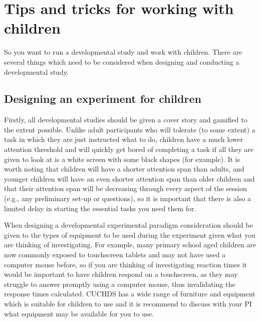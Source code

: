 \documentclass[
  12pt,
]{book}
\begin{document}
\chapter{Tips and tricks for working with children}\label{tips-and-tricks-for-working-with-children}

So you want to run a developmental study and work with children. There are several things which need to be considered when designing and conducting a developmental study.

\section{Designing an experiment for children}\label{designing-an-experiment-for-children}

Firstly, all developmental studies should be given a cover story and gamified to the extent possible. Unlike adult participants who will tolerate (to some extent) a task in which they are just instructed what to do, children have a much lower attention threshold and will quickly get bored of completing a task if all they are given to look at is a white screen with some black shapes (for example). It is worth noting that children will have a shorter attention span than adults, and younger children will have an even shorter attention span than older children and that their attention span will be decreasing through every aspect of the session (e.g., any preliminary set-up or questions), so it is important that there is also a limited delay in starting the essential tasks you need them for.

When designing a developmental experimental paradigm consideration should be given to the types of equipment to be used during the experiment given what you are thinking of investigating. For example, many primary school aged children are now commonly exposed to touchscreen tablets and may not have used a computer mouse before, so if you are thinking of investigating reaction times it would be important to have children respond on a touchscreen, as they may struggle to answer promptly using a computer mouse, thus invalidating the response times calculated. CUCHDS has a wide range of furniture and equipment which is suitable for children to use and it is recommend to discuss with your PI what equipment may be available for you to use.
\end{document}
